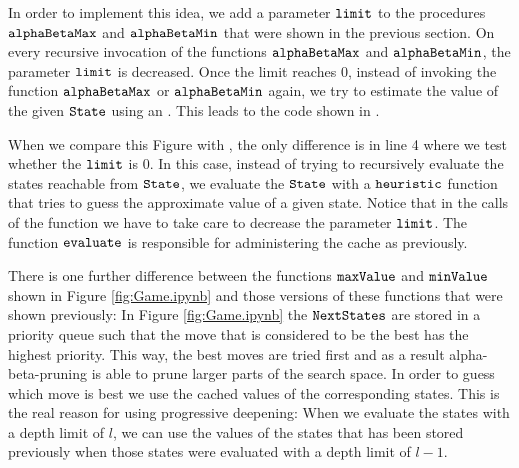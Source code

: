 In order to implement this idea, we add a parameter $\texttt{limit}$ to the procedures $\texttt{alphaBetaMax}$
and $\texttt{alphaBetaMin}$ that were shown in the previous section.  On
every recursive invocation of the functions $\texttt{alphaBetaMax}$ and $\texttt{alphaBetaMin}$, the parameter
$\texttt{limit}$ is decreased. 
Once the limit reaches $0$, instead of invoking the function $\texttt{alphaBetaMax}$ or $\texttt{alphaBetaMin}$
again, we try to estimate the value of the given $\texttt{State}$ using an .  This
leads to the code shown in . 

When we compare this Figure with , the only difference is in line 4
where we test whether the $\texttt{limit}$ is $0$.  In this case, instead of trying to recursively evaluate the
states reachable from $\texttt{State}$, we evaluate the $\texttt{State}$ with a $\texttt{heuristic}$ function
that tries to guess the approximate value of a given state.
Notice that in the calls of the function  we have to take care to decrease the parameter
$\texttt{limit}$.  The function $\texttt{evaluate}$ is responsible for administering the cache as previously.

There is one further difference between the functions $\texttt{maxValue}$ and $\texttt{minValue}$ shown in
Figure \ref{fig:Game.ipynb} and those versions of these functions that were shown previously:
In Figure \ref{fig:Game.ipynb} the $\texttt{NextStates}$ are stored in a priority queue such that the move that
is considered to be the best has the highest priority.  This way, the best moves are tried first and as a
result alpha-beta-pruning is able to prune larger parts of the search space.
In order to guess which move is best we use the cached values of the corresponding states.  This is the real
reason for using progressive deepening:  When we evaluate the states with a depth limit of $l$, we can use the
values of the states that has been stored previously when those states were evaluated with a depth limit of
$l-1$. 

